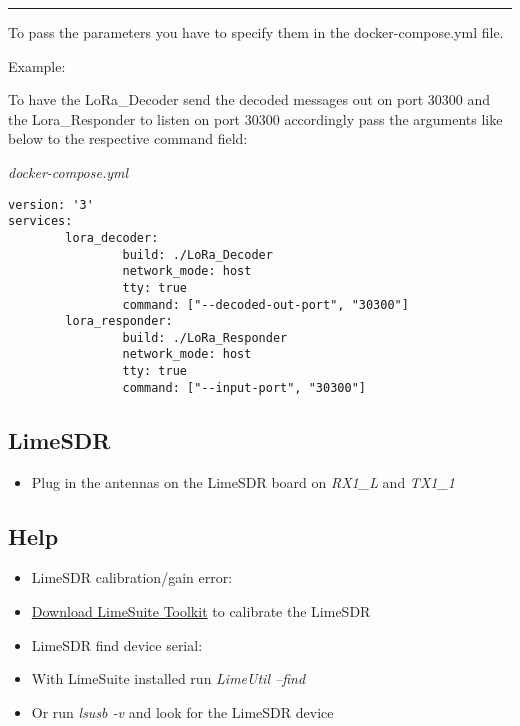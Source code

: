 \begin{center}\rule{0.5\linewidth}{\linethickness}\end{center}

To pass the parameters you have to specify them in the
docker-compose.yml file.

Example:

To have the LoRa\_Decoder send the decoded messages out on port 30300
and the Lora\_Responder to listen on port 30300 accordingly pass the
arguments like below to the respective command field:

\emph{docker-compose.yml}

\begin{verbatim}
version: '3'
services:
        lora_decoder:
                build: ./LoRa_Decoder
                network_mode: host
                tty: true
                command: ["--decoded-out-port", "30300"]
        lora_responder:
                build: ./LoRa_Responder
                network_mode: host
                tty: true
                command: ["--input-port", "30300"] 
\end{verbatim}

\subsection{LimeSDR}\label{limesdr}

\begin{itemize}
\tightlist
\item
  Plug in the antennas on the LimeSDR board on \emph{RX1\_L} and
  \emph{TX1\_1}
\end{itemize}

\subsection{Help}\label{help}

\begin{itemize}
\item
  LimeSDR calibration/gain error:
\item
  \href{https://wiki.myriadrf.org/Lime_Suite}{Download LimeSuite
  Toolkit} to calibrate the LimeSDR
\item
  LimeSDR find device serial:
\item
  With LimeSuite installed run \emph{LimeUtil --find}
\item
  Or run \emph{lsusb -v} and look for the LimeSDR device
\end{itemize}

